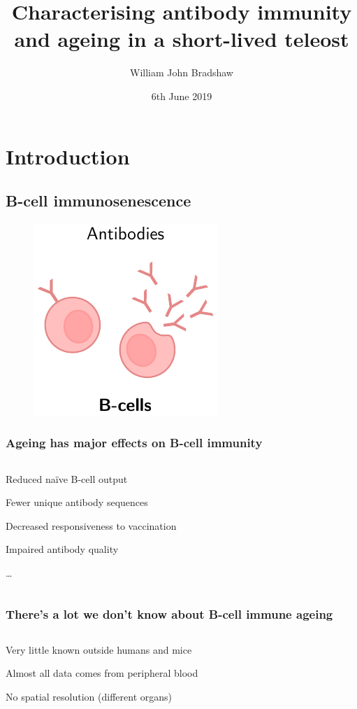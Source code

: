 \documentclass[presentation]{beamer}
\title[Thesis defence presentation]{Characterising antibody immunity and ageing in a short-lived teleost}
\author[William John Bradshaw]{William John Bradshaw}
\date{6th June 2019}
\newlength{\slideheight}
\begin{document}
\begin{frame}
\titlepage
\end{frame}

\section{Introduction}

\subsection{B-cell immunosenescence}

\begin{frame}
\begin{figure}
\includegraphics[height=1.1\slideheight]{figs/pdf/adaptive-immunity-bcells}
\end{figure}
\end{frame}

\begin{frame}
\frametitle{Ageing has major effects on B-cell immunity}\pause
\begin{columns}
\begin{wideitemize}{0.5}
\item Reduced na\"ive B-cell output
\item Fewer unique antibody sequences
\item Decreased responsiveness to vaccination
\item Impaired antibody quality
\item \dots
\end{wideitemize}
\end{columns}
\end{frame}

\begin{frame}
\frametitle{There's a lot we don't know about B-cell immune ageing}
\begin{columns}
\pause
\begin{wideitemize}{1}
\item Very little known outside humans and mice\pause
\item Almost all data comes from peripheral blood\pause
\item No spatial resolution (different organs)
\end{wideitemize}
\end{columns}
\end{frame}
\end{document}
